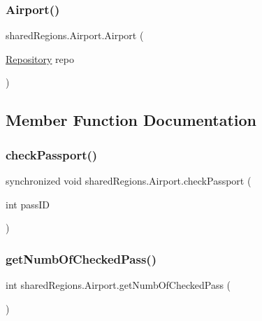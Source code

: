 \subsubsection{\texorpdfstring{Airport()}{Airport()}}
{\footnotesize\ttfamily shared\+Regions.\+Airport.\+Airport (\begin{DoxyParamCaption}\item[{\hyperlink{classshared_regions_1_1_repository}{Repository}}]{repo }\end{DoxyParamCaption})}



\subsection{Member Function Documentation}
\mbox{\label{classshared_regions_1_1_airport_a1dba750b542f28455a143973bbc877a0}} 
\subsubsection{\texorpdfstring{check\+Passport()}{checkPassport()}}
{\footnotesize\ttfamily synchronized void shared\+Regions.\+Airport.\+check\+Passport (\begin{DoxyParamCaption}\item[{int}]{pass\+ID }\end{DoxyParamCaption})}

\mbox{\label{classshared_regions_1_1_airport_a7b6204177fb19b848d01c57048bc2c69}} 
\subsubsection{\texorpdfstring{get\+Numb\+Of\+Checked\+Pass()}{getNumbOfCheckedPass()}}
{\footnotesize\ttfamily int shared\+Regions.\+Airport.\+get\+Numb\+Of\+Checked\+Pass (\begin{DoxyParamCaption}{ }\end{DoxyParamCaption})}

